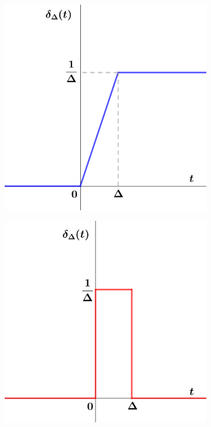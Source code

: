 \documentclass[a4paper]{book}
\begin{document}
\begin{figure}[!ht]
	\caption{}
	\label{fig:escalon_e_impulso}
	\centering
	\begin{subfigure}[b]{0.45\linewidth}
		\includegraphics[width=\linewidth]{./Imágenes/aas.png}
		\label{subfig:escalon}
	\end{subfigure}
	\hfill
	\begin{subfigure}[b]{0.45\linewidth}
		\includegraphics[width=\linewidth]{./Imágenes/aat.png}
		\label{subfig:impulso}
	\end{subfigure}
\end{figure}
\end{document}
